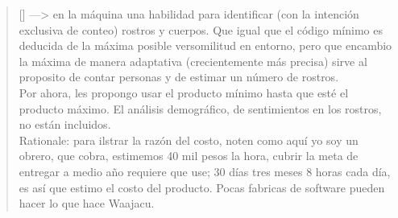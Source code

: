 \documentclass[11pt, a4paper]{article} %
\newcommand{\poemauthorright}[1]{\nopagebreak{\raggedleft\footnotesize\textsc{#1}\par}} %
\begin{document}
\begin{verse}[\versewidth]
{---> en la máquina una habilidad para identificar (con la intención exclusiva de conteo) 
rostros y cuerpos. Que igual que el código mínimo es deducida de la máxima posible 
versomilitud en entorno, pero que encambio la máxima de manera adaptativa 
(crecientemente más precisa) sirve al proposito de contar personas y de estimar 
un número de rostros. \\

Por ahora, les propongo usar el producto mínimo hasta que esté el producto máximo. 
El análisis demográfico, de sentimientos en los rostros, no están incluidos. \\

Rationale: para ilstrar la razón del costo, noten como aquí yo soy un obrero, 
que cobra, estimemos 40 mil pesos la hora, cubrir la meta de entregar a medio 
año requiere que use; 30 días tres meses 8 horas cada día, es así que estimo
el costo del producto. Pocas fabricas de software pueden hacer lo que hace Waajacu.\\

}
\end{verse}


\poemauthorright{www.WAAJACU.com} %

\end{document}

